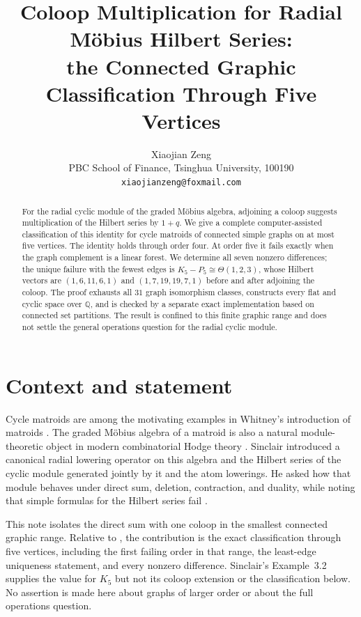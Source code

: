 \documentclass[11pt]{article}
\title{Coloop Multiplication for Radial M\"obius Hilbert Series:\\
the Connected Graphic Classification Through Five Vertices}
\author{Xiaojian Zeng\\
PBC School of Finance, Tsinghua University, 100190\\
\texttt{xiaojianzeng@foxmail.com}}
\date{}
\theoremstyle{remark}
\newcommand{\Q}{\mathbb{Q}}
\begin{document}
\maketitle

\begin{abstract}
For the radial cyclic module of the graded M\"obius algebra, adjoining a
coloop suggests multiplication of the Hilbert series by $1+q$.  We give a
complete computer-assisted classification of this identity for cycle
matroids of connected simple graphs on at most five vertices.  The identity
holds through order four.  At order five it fails exactly when the graph
complement is a linear forest.  We determine all seven nonzero differences;
the unique failure with the fewest edges is
$K_5-P_5\cong\Theta(1,2,3)$, whose Hilbert vectors are
$(1,6,11,6,1)$ and $(1,7,19,19,7,1)$ before and after adjoining the
coloop.  The proof exhausts all $31$ graph isomorphism classes, constructs
every flat and cyclic space over $\Q$, and is checked by a separate exact
implementation based on connected set partitions.  The result is confined
to this finite graphic range and does not settle the general operations
question for the radial cyclic module.
\end{abstract}

\section{Context and statement}

Cycle matroids are among the motivating examples in Whitney's introduction
of matroids \cite{Whitney1935}.  The graded M\"obius algebra of a matroid is
also a natural module-theoretic object in modern combinatorial Hodge theory
\cite{BradenEtAl2026}.  Sinclair \cite{Sinclair2026} introduced a canonical
radial lowering operator on this algebra and the Hilbert series of the cyclic
module generated jointly by it and the atom lowerings.  He asked how that
module behaves under direct sum, deletion, contraction, and duality, while
noting that simple formulas for the Hilbert series fail
\cite[Question~6.3]{Sinclair2026}.

This note isolates the direct sum with one coloop in the smallest connected
graphic range.  Relative to \cite{Sinclair2026}, the contribution is the
exact classification through five vertices, including the first failing
order in that range, the least-edge uniqueness statement, and every nonzero
difference.  Sinclair's Example~3.2 supplies the value for $K_5$ but not its
coloop extension or the classification below.  No assertion is made here
about graphs of larger order or about the full operations question.
\end{document}
